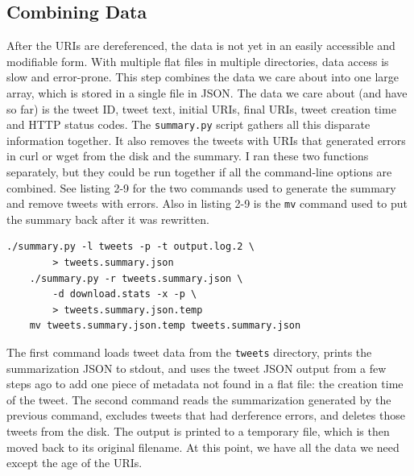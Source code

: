 \documentclass[a4paper,12pt]{article}
\begin{document}
\subsection{Combining Data}
After the URIs are dereferenced, the data is not yet in an easily accessible and modifiable form. With
multiple flat files in multiple directories, data access is slow and error-prone. This step combines the
data we care about into one large array, which is stored in a single file in JSON. The data we care about
(and have so far) is the tweet ID, tweet text, initial URIs, final URIs, tweet creation time
and HTTP status codes. The \texttt{summary.py} script gathers all this disparate information together.
It also removes the tweets with URIs that generated errors in curl or wget from the disk and the summary.
I ran these two functions separately,
but they could be run together if all the command-line options are combined. See listing 2-9 for the two
commands used to generate the summary and remove tweets with errors. Also in listing 2-9 is the
\texttt{mv} command used to put the summary back after it was rewritten.
\begin{lstlisting}[basicstyle=\ttfamily,caption={Summarization and Errored Tweet Removal}]
    ./summary.py -l tweets -p -t output.log.2 \
        > tweets.summary.json
    ./summary.py -r tweets.summary.json \
        -d download.stats -x -p \
        > tweets.summary.json.temp
    mv tweets.summary.json.temp tweets.summary.json
\end{lstlisting}
The first command loads tweet data from the \texttt{tweets} directory, prints the summarization JSON
to stdout, and uses the tweet JSON output from a few steps ago to add one piece of metadata not found
in a flat file: the creation time of the tweet. The second command reads the summarization generated
by the previous command, excludes tweets that had derference errors, and deletes those tweets from
the disk. The output is printed to a temporary file, which is then moved back to its original
filename. At this point, we have all the data we need except the age of the URIs.
\end{document}
